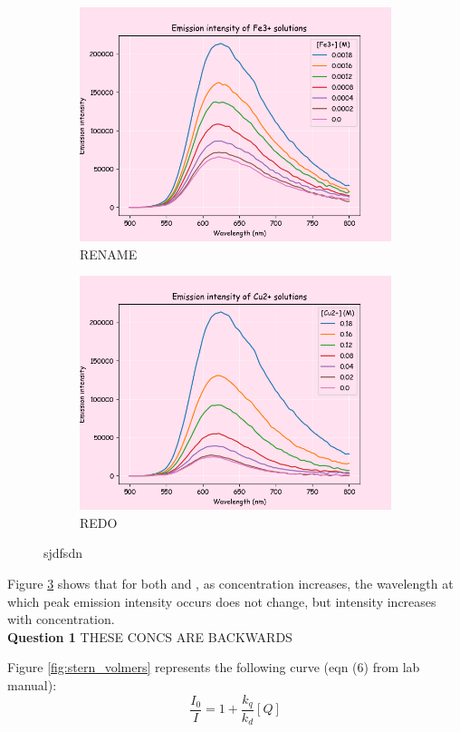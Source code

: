 \begin{figure}[H]
     \centering
     \begin{subfigure}[b]{0.49\textwidth}
         \centering
         \includegraphics[width=\textwidth]{part1_fe.png}
         \caption{RENAME}
         \label{fig:part1_fe}
     \end{subfigure}
     \hfill
     \begin{subfigure}[b]{0.49\textwidth}
         \centering
         \includegraphics[width=\textwidth]{part1_cu.png}
         \caption{REDO}
         \label{fig:part1_Cu}
     \end{subfigure}
     \caption{sjdfsdn}
     \label{fig:part1_fecu_spectra}
\end{figure}
Figure \ref{fig:part1_fecu_spectra} shows that for both  and , as concentration increases, the wavelength at which peak emission intensity occurs does not change, but intensity increases with concentration.
\\
\textbf{Question 1}
THESE CONCS ARE BACKWARDS

\par Figure \ref{fig:stern_volmers} represents the following curve (eqn (6) from lab manual\autocite{lab_manual}):
\begin{equation*}
    \frac{I_0}{I} = 1 + \frac{k_q}{k_d}[Q]
\end{equation*}

